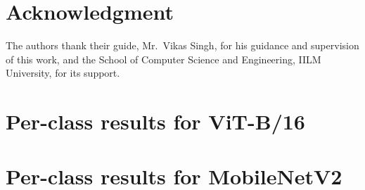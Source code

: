 \documentclass[conference]{IEEEtran}
\begin{document}
\section*{Acknowledgment}
The authors thank their guide, Mr.~Vikas Singh, for his guidance and supervision of this work, and the School of Computer Science and Engineering, IILM University, for its support.




\appendices
\section{Per-class results for ViT-B/16}
\begin{table}[h]
\caption{Per-class precision, recall, F1 and support for ViT-B/16 on the test set.}
\centering
\tiny
\resizebox{\columnwidth}{!}{}
\label{tab:perclass_vit}
\end{table}

\section{Per-class results for MobileNetV2}
\begin{table}[h]
\caption{Per-class precision, recall, F1 and support for MobileNetV2 on the test set (seed 42, near-duplicate-aware split).}
\label{tab:perclass_mnv2}
\centering
\tiny
\resizebox{\columnwidth}{!}{}
\end{table}
\end{document}
